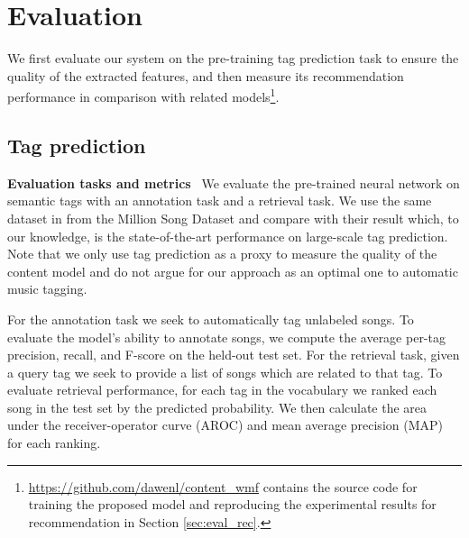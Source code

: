 \section{Evaluation}\label{eval}

We first evaluate our system on the pre-training tag prediction task to ensure the quality of the extracted features, and then measure its recommendation performance in comparison with related models\footnote{\url{https://github.com/dawenl/content_wmf} contains the source code for training the proposed model and reproducing the experimental results for recommendation in Section \ref{sec:eval_rec}.}.

\subsection{Tag prediction}\label{sec:tag}

\noindent\textbf{Evaluation tasks and  metrics}~
We evaluate the pre-trained neural network on semantic tags with an annotation task and a retrieval task. We use the same dataset in  from the Million Song Dataset \citep{bertin2011million} and compare with their result which, to our knowledge, is the state-of-the-art performance on large-scale tag prediction. Note that we only use tag prediction as a proxy to measure the quality of the content model and do not argue for our approach as an optimal one to automatic music tagging.  

For the annotation task we seek to automatically tag unlabeled songs. To evaluate the model's ability to annotate songs, we compute the average per-tag precision, recall, and F-score on the held-out test set. %
For the retrieval task, given a query tag we seek to provide a list of songs which are related to that tag. To evaluate retrieval performance, for each tag in the vocabulary we ranked each song in the test set by the predicted probability. We then calculate the area under the receiver-operator curve (AROC) and mean average precision (MAP) for each ranking. %

